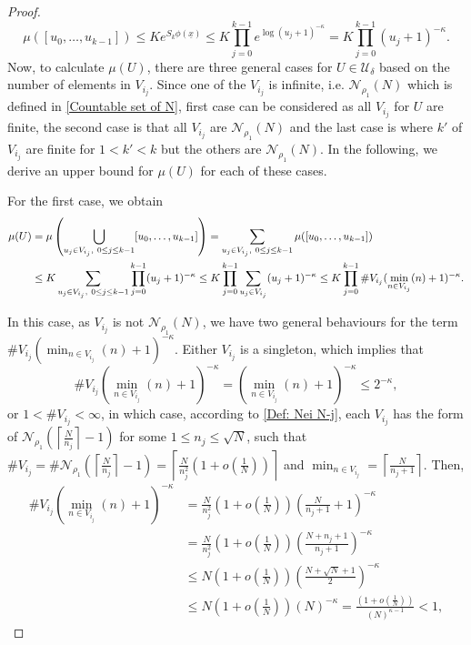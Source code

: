 \documentclass[11pt, reqno]{amsart}
\theoremstyle{plain}%
\theoremstyle{definition}
\theoremstyle{definition}
\def\U{\ensuremath{\mathcal U}}
\def\st{such that }
\numberwithin{equation}{section}
\begin{document}
\begin{proof}
\begin{equation*}
    \mu([u_0,\ldots,u_{k-1}])\le K e^{S_k{\phi}(\underline{x})}\le K \prod_{j=0}^{k-1} e^{\log (u_j+1)^{-\kappa}}= K \prod_{j=0}^{k-1}(u_j+1)^{-\kappa}.
\end{equation*}
Now, to calculate $\mu(U)$, there are three general cases for $U\in\U_\delta$ based on the number of elements in $V_{i_j}$. Since one of the $V_{i_j}$ is infinite, i.e. $\mathcal{N}_{\rho_1}(N)$ which is defined in \eqref{Countable set of N}, first case can be considered as all $V_{i_j}$ for $U$ are finite, the second case is that all $V_{i_j}$ are $\mathcal{N}_{\rho_1}(N)$ and the last case is where $k'$ of $V_{i_j}$ are finite for $1<k'<k$ but the others are $\mathcal{N}_{\rho_1}(N)$. In the following, we derive an upper bound for $\mu(U)$ for each of these cases.

For the first case, we obtain
\begin{align}\label{calculating_mu}
\notag \mu(U)&=\mu\left(\bigcup_{u_j\in V_{i_j},\ 0\le j\le k-1} [u_0,\ldots,u_{k-1}]\right)= \sum_{u_j\in V_{i_j},\ 0\le j\le k-1}\mu([u_0,\ldots,u_{k-1}])\\&\le K \sum_{u_j\in V_{i_j},\ 0\le j\le k-1}\prod_{j=0}^{k-1}(u_j+1)^{-\kappa} \le K  \prod_{j=0}^{k-1}\sum_{u_j\in V_{i_j}} (u_j+1)^{-\kappa} \le K \prod_{j=0}^{k-1} \#V_{i_j} (\min_{n\in V_{i_j}} (n)+1)^{-\kappa}.
\end{align}

In this case, as $V_{i_j}$ is not $\mathcal{N}_{\rho_1}(N)$, we have two general behaviours for the term $\#V_{i_j} (\min_{n\in V_{i_j}} (n)+1)^{-\kappa}$. Either $V_{i_j}$ is a singleton, which implies that
$$\#V_{i_j} (\min_{n\in V_{i_j}} (n)+1)^{-\kappa}=  (\min_{n\in V_{i_j}} (n)+1)^{-\kappa}\le 2^{-\kappa},$$
or $1<\#V_{i_j}<\infty$, in which case, according to \eqref{Def: Nei N-j}, each $V_{i_j}$ has the form of  $\mathcal{N}_{\rho_1}\left(\left\lceil\frac{N}{n_j}\right\rceil-1\right)$ for some $1\le n_j\le \sqrt{N}$, \st $\#V_{i_j}=\#\mathcal{N}_{\rho_1}\left(\left\lceil\frac{N}{n_j}\right\rceil-1\right)=\left\lceil\frac{N}{n_j^2}\left(1+o\left(\frac1{N}\right)\right)\right\rceil$ and $\min_{n\in V_{i_j}}=\left\lceil\frac{N}{n_j+1}\right\rceil$. Then, 
\begin{align*}
    \#V_{i_j} (\min_{n\in V_{i_j}} (n)+1)^{-\kappa}&= \frac{N}{n_j^2}\left(1+o\left(\frac1{N}\right)\right) \left(\frac{N}{n_j+1}+1\right)^{-\kappa}\\&= \frac{N}{n_j^2}\left(1+o\left(\frac1{N}\right)\right)\left(\frac{N+n_j+1}{n_j+1}\right)^{-\kappa}\\& \le   N\left(1+o\left(\frac1{N}\right)\right)\left(\frac{N+\sqrt{N}+1}{2}\right)^{-\kappa} \\& \le   N\left(1+o\left(\frac1{N}\right)\right)\left(N\right)^{-\kappa}=  \frac{\left(1+o\left(\frac1{N}\right)\right)}{\left(N\right)^{\kappa-1}}<1,
 \end{align*}


\end{proof}
\end{document}
